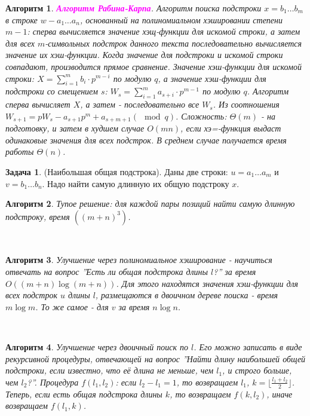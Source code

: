 \documentclass[a4paper]{article}
\theoremstyle{indented}
\newtheorem{alg}{Алгоритм}
\theoremstyle{definition}
\newtheorem{prob}{Задача}
\theoremstyle{remark}
\begin{document}
\begin{alg}
    \textcolor{magenta}{\hypertarget{t31}{\textbf{Алгоритм Рабина-Карпа}}}. Алгоритм поиска подстроки $x=b_1\ldots b_m$ в строке $w-a_1\ldots a_n$, основанный на полиномиальном хэшировании степени $m-1$: сперва вычисляется значение хэщ-функции для искомой строки, а затем для всех $m$-символьных подстрок данного текста последовательно вычисляется значение их хэш-функции. Когда значение для подстроки и искомой строки совпадают, производится прямое сравнение. Значение хэш-функции для искомой строки: $X=\sum_{i=1}^m b_i\cdot p^{m-i}$ по модулю $q$, а значение хэш-функции для подстроки со смещением $s$: $W_s=\sum_{i=1}^m a_{s+i}\cdot p^{m-1}$ по модулю $q$. Алгоритм сперва вычисляет $X$, а затем - последовательно все $W_s$. Из соотношения $W_{s+1}=pW_s-a_{s+1}p^m+a_{s+m+1}(\mod{q})$. Сложность: $\Theta(m)$ - на подготовку, и затем в худшем случае $O(mn)$, если хэ=-функция выдаст одинаковые значения для всех подстрок. В среднем случае получается время работы $\Theta(n)$. 
\end{alg}

\begin{prob}
    (Наибольшая общая подстрока). Даны две строки: $u=a_1\ldots a_m$ и $v=b_1\ldots b_n$. Надо найти самую длинную их общую подстроку $x$. 
\end{prob}

\begin{alg}
    Тупое решение: для каждой пары позиций найти самую длинную подстроку, время $((m+n)^3)$. 
\end{alg} \

\begin{alg}
    Улучшение через полиномиальное хэширование - научиться отвечать на вопрос ''Есть ли общая подстрока длины $l$?'' за время $O((m+n)\log(m+n))$. Для этого находятся значения хэш-функции для всех подстрок $u$ длины $l$, размещаются в двоичном дереве поиска - время $m\log m$. То же самое - для $v$ за время $n\log n$. 
\end{alg} \

\begin{alg}
    Улучшение через двоичный поиск по $l$. Его можно записать в виде рекурсивной процедуры, отвечающей на вопрос ''Найти длину наибольшей общей подстроки, если известно, что её длина не меньше, чем $l_1$, и строго больше, чем $l_2$?''. Процедура $f(l_1, l_2)$: если $l_2-l_1=1$, то возвращаем $l_1$, $k=\lfloor \frac{l_1+l_2}{2}\rfloor$. Теперь, если есть общая подстрока длины $k$, то возвращаем $f(k, l_2)$, иначе возвращаем $f(l_1, k)$. 
\end{alg}
\end{document}
